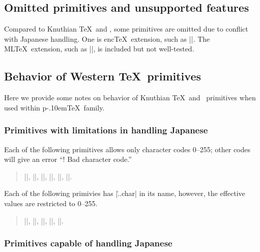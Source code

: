 \documentclass[a4paper,11pt]{article}
\def\pTeX{p\kern-.10em\TeX}
\begin{document}
\subsection{Omitted primitives and unsupported features}

Compared to Knuthian \TeX\ and \eTeX,
some primitives are omitted due to conflict with Japanese handling.
One is enc\TeX\ extension, such as |\mubyte|.
The ML\TeX\ extension, such as |\charsubdef|, is included but not well-tested.


\subsection{Behavior of Western \TeX\ primitives}

Here we provide some notes on behavior of Knuthian \TeX\ and \eTeX\ primitives
when used within \pTeX\ family.

\subsubsection{Primitives with limitations in handling Japanese}

Each of the following primitives allows only character codes 0--255;
other codes will give an error ``! Bad character code.''
\begin{quote}
 |\catcode|,
 |\sfcode|,
 |\mathcode|,
 |\delcode|,
 |\lccode|,
 |\uccode|.
\end{quote}

Each of the following primivies has |\...char| in its name,
however, the effective values are restricted to 0--255.
\begin{quote}
 |\endlinechar|,
 |\newlinechar|,
 |\escapechar|,
 ||,
 ||.
\end{quote}

\subsubsection{Primitives capable of handling Japanese}
\end{document}
